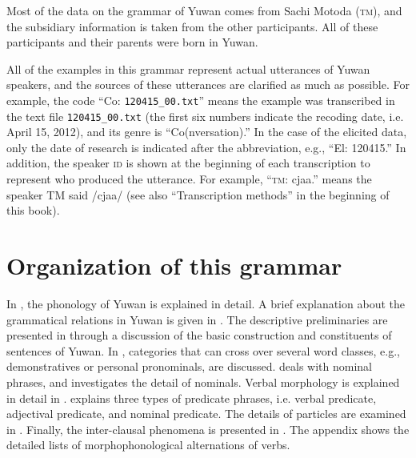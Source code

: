 Most of the data on the grammar of Yuwan comes from Sachi Motoda (\textsc{tm}), and the subsidiary information is taken from the other participants. All of these participants and their parents were born in Yuwan.

All of the examples in this grammar represent actual utterances of Yuwan speakers, and the sources of these utterances are clarified as much as possible. For example, the code “Co: \texttt{120415\_00.txt}” means the example was transcribed in the text file \texttt{120415\_00.txt} (the first six numbers indicate the recoding date, i.e. April 15, 2012), and its genre is “Co(nversation).” In the case of the elicited data, only the date of research is indicated after the abbreviation, e.g., “El: 120415.” In addition, the speaker \textsc{id} is shown at the beginning of each transcription to represent who produced the utterance. For example, “\textsc{tm}: cjaa.” means the speaker TM said /cjaa/ (see also “Transcription methods” in the beginning of this book).

\section{Organization of this grammar}
\hypertarget{RefHeadingToc395696959}{}
In , the phonology of Yuwan is explained in detail. A brief explanation about the grammatical relations in Yuwan is given in . The descriptive preliminaries are presented in  through a discussion of the basic construction and constituents of sentences of Yuwan. In , categories that can cross over several word classes, e.g., demonstratives or personal pronominals, are discussed.  deals with nominal phrases, and  investigates the detail of nominals. Verbal morphology is explained in detail in .  explains three types of predicate phrases, i.e. verbal predicate, adjectival predicate, and nominal predicate. The details of particles are examined in . Finally, the inter-clausal phenomena is presented in . The appendix shows the detailed lists of morphophonological alternations of verbs.
